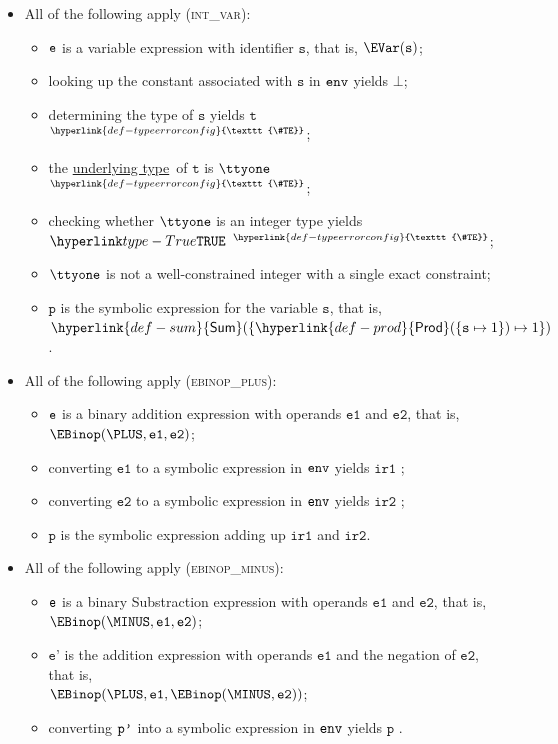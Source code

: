 \documentclass{book}
\newcommand\TypeErrorConfig[0]{\hyperlink{def-typeerrorconfig}{\texttt{\#TE}}}
\newcommand\ProseOrTypeError[0]{\hyperlink{def-proseortypeerror}{$^{\TypeErrorConfig}$}}
\newcommand\Prod[0]{\hyperlink{def-prod}{\textsf{Prod}}}
\newcommand\Sum[0]{\hyperlink{def-sum}{\textsf{Sum}}}
\newcommand\underlyingtype[0]{\hyperlink{def-underlyingtype}{underlying type}}
\newcommand\vp[0]{\texttt{p}}
\newcommand\vt[0]{\texttt{t}}
\newcommand\veone[0]{\texttt{e1}}
\newcommand\vetwo[0]{\texttt{e2}}
\newcommand\vs[0]{\texttt{s}}
\newcommand\irone[0]{\texttt{ir1}}
\newcommand\irtwo[0]{\texttt{ir2}}
\newcommand\vep[0]{\texttt{e'}}
\begin{document}
\begin{itemize}
  \item All of the following apply (\textsc{int\_var}):
  \begin{itemize}
    \item $\texttt{e}$ is a variable expression with identifier $\vs$, that is, $\EVar(\vs)$;
    \item looking up the constant associated with $\vs$ in $\texttt{env}$ yields $\bot$;
    \item determining the type of $\vs$ yields $\vt$ \ProseOrTypeError;
    \item the \underlyingtype\ of $\vt$ is $\ttyone$ \ProseOrTypeError;
    \item checking whether $\ttyone$ is an integer type yields $\True$ \ProseOrTypeError;
    \item $\ttyone$ is not a well-constrained integer with a single exact constraint;
    \item $\vp$ is the symbolic expression for the variable $\vs$, that is, $\Sum( \{ \Prod(\{\vs\mapsto 1\})\mapsto 1 \} )$.
  \end{itemize}

  \item All of the following apply (\textsc{ebinop\_plus}):
  \begin{itemize}
    \item $\texttt{e}$ is a binary addition expression with operands $\veone$ and $\vetwo$, that is, \\ $\EBinop(\PLUS, \veone, \vetwo)$;
    \item converting $\veone$ to a symbolic expression in $\texttt{env}$ yields $\irone$ \ProseOrTypeErrorOrBot;
    \item converting $\vetwo$ to a symbolic expression in $\texttt{env}$ yields $\irtwo$ \ProseOrTypeErrorOrBot;
    \item $\vp$ is the symbolic expression adding up $\irone$ and $\irtwo$.
  \end{itemize}

  \item All of the following apply (\textsc{ebinop\_minus}):
  \begin{itemize}
    \item $\texttt{e}$ is a binary Substraction expression with operands $\veone$ and $\vetwo$, that is, \\ $\EBinop(\MINUS, \veone, \vetwo)$;
    \item $\vep$ is the addition expression with operands $\veone$ and the negation of $\vetwo$, that is, \\ $\EBinop(\PLUS, \veone, \EBinop(\MINUS, \vetwo))$;
    \item converting $\texttt{p'}$ into a symbolic expression in $\texttt{env}$ yields $\vp$ \ProseOrTypeErrorOrBot.
  \end{itemize}


\end{itemize}
\end{document}
